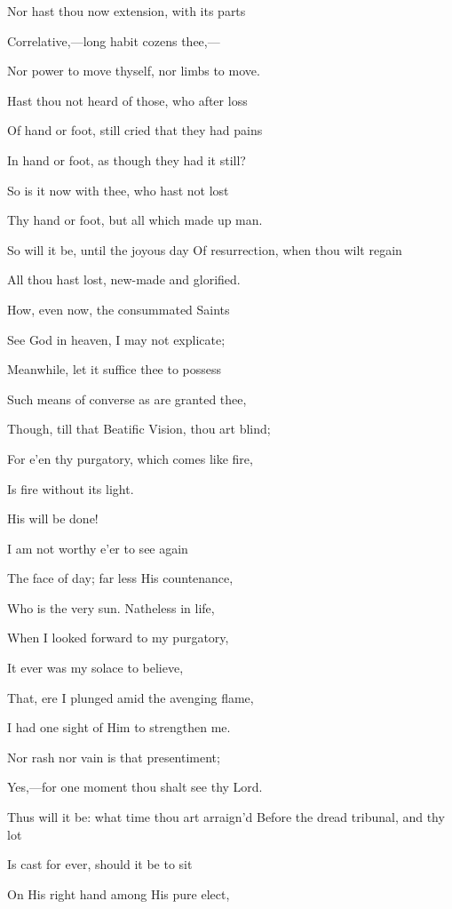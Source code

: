 Nor hast thou now extension, with its parts

Correlative,—long habit cozens thee,—

Nor power to move thyself, nor limbs to move.

Hast thou not heard of those, who after loss

Of hand or foot, still cried that they had pains

In hand or foot, as though they had it still?

So is it now with thee, who hast not lost

Thy hand or foot, but all which made up man.

So will it be, until the joyous day Of resurrection, when thou wilt regain

All thou hast lost, new-made and glorified.

How, even now, the consummated Saints

See God in heaven, I may not explicate;

Meanwhile, let it suffice thee to possess

Such means of converse as are granted thee,

Though, till that Beatific Vision, thou art blind;

For e'en thy purgatory, which comes like fire,

Is fire without its light.


His will be done!

I am not worthy e'er to see again

The face of day; far less His countenance,

Who is the very sun. Natheless in life,

When I looked forward to my purgatory,

It ever was my solace to believe,

That, ere I plunged amid the avenging flame,

I had one sight of Him to strengthen me.


Nor rash nor vain is that presentiment;

Yes,—for one moment thou shalt see thy Lord.

Thus will it be: what time thou art arraign'd Before the dread tribunal, and thy lot

Is cast for ever, should it be to sit

On His right hand among His pure elect,

